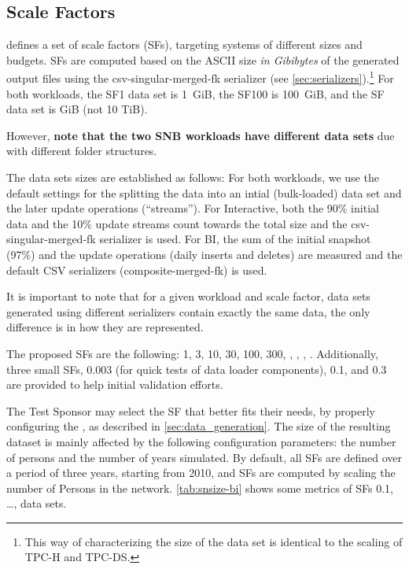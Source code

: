 \subsection{Scale Factors}
\label{sec:scale-factors}

\ldbcsnb defines a set of scale factors (SFs), targeting systems of different sizes and budgets.
SFs are computed based on the ASCII size \emph{in Gibibytes} of the generated output files using the \textsf{csv-singular-merged-fk} serializer (see \autoref{sec:serializers}).\footnote{This way of characterizing the size of the data set is identical to the scaling of TPC-H and TPC-DS.}
For both workloads, the SF1 data set is 1~GiB, the SF100 is 100~GiB, and the SF data set is  GiB (not 10 TiB).

However, \textbf{note that the two SNB workloads have different data sets} due with different folder structures.

The data sets sizes are established as follows:
For both workloads, we use the default settings for the splitting the data into an intial (bulk-loaded) data set and the later update operations (``streams'').
For Interactive, both the 90\% initial data and the 10\% update streams count towards the total size and the \textsf{csv-singular-merged-fk} serializer is used.
For BI, the sum of the initial snapshot (97\%) and the update operations (daily inserts and deletes) are measured and the default CSV serializers (\textsf{composite-merged-fk}) is used.

It is important to note that for a given workload and scale factor, data sets generated using different serializers contain exactly the same data, the only difference is in how they are represented.%

The proposed SFs are the following: 1, 3, 10, 30, 100, 300, , , , .
Additionally, three small SFs, 0.003 (for quick tests of data loader components), 0.1, and 0.3 are provided to help initial validation efforts.

The Test Sponsor may select the SF that better fits their needs, by properly configuring the \datagen, as described in \autoref{sec:data_generation}.
The size of the resulting dataset is mainly affected by the following configuration parameters: the number of persons and the number of years simulated.
By default, all SFs are defined over a period of three years, starting from 2010, and SFs are computed by scaling the number of Persons in the network.
\autoref{tab:snsize-bi} shows some metrics of SFs 0.1, \ldots,  data sets.

